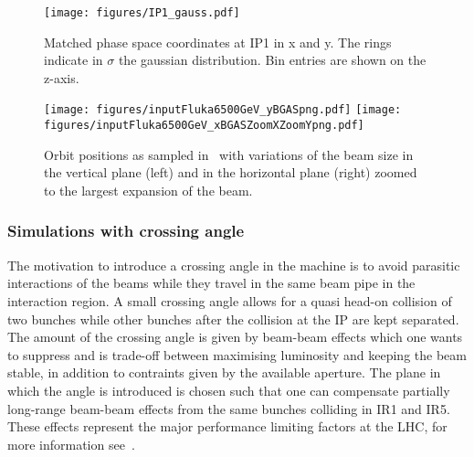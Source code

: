 \begin{figure}%
\begin{center}
\texttt{[image: figures/IP1\_gauss.pdf]}
\end{center}
\vspace{-0.6cm}
 \caption{Matched phase space coordinates at IP1 in x and y. The rings indicate in $\sigma$ the gaussian distribution. Bin entries are shown on the z-axis.
  \label{ip1_gauss}}
\end{figure}


\begin{figure}[!htb]
\begin{center}
  \texttt{[image: figures/inputFluka6500GeV\_yBGASpng.pdf]}
  \texttt{[image: figures/inputFluka6500GeV\_xBGASZoomXZoomYpng.pdf]}
\end{center}
\vspace{-0.6cm}
 \caption{Orbit positions as sampled in \fluka~with variations of the beam size in the vertical plane (left) and in the horizontal plane (right) zoomed to the largest expansion of the beam.
  \label{BGASflukaInp}}
\end{figure}


\subsubsection{Simulations with crossing angle}
The motivation to introduce a crossing angle in the machine is to avoid parasitic interactions of the beams while they travel in the same beam pipe in the interaction region. A small crossing angle allows for a quasi head-on collision of two bunches while other bunches after the collision at the IP are kept separated. The amount of the crossing angle is given by beam-beam effects which one wants to suppress and is trade-off between maximising luminosity and keeping the beam stable, in addition to contraints given by the available aperture. The plane in which the angle is introduced is chosen such that one can compensate partially long-range beam-beam effects from the same bunches colliding in IR1 and IR5. These effects represent the major performance limiting factors at the LHC, for more information see~\cite{wherrSlides2013,wernerLHCreport}.

